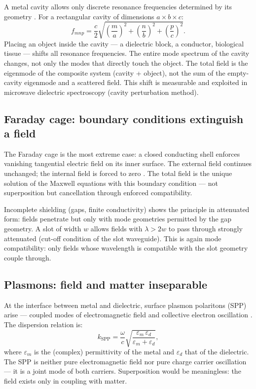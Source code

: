 A metal cavity allows only discrete resonance frequencies determined by
its geometry \cite{Pozar2012,Griffiths1999}. For a rectangular cavity
of dimensions $a \times b \times c$:
\[
  f_{mnp} = \frac{c}{2}\sqrt{\left(\frac{m}{a}\right)^2
    + \left(\frac{n}{b}\right)^2 + \left(\frac{p}{c}\right)^2}.
\]
Placing an object inside the cavity --- a dielectric block, a conductor,
biological tissue --- shifts all resonance frequencies. The entire mode
spectrum of the cavity changes, not only the modes that directly touch the
object. The total field is the eigenmode of the composite system (cavity
+ object), not the sum of the empty-cavity eigenmode and a scattered field.
This shift is measurable and exploited in microwave dielectric spectroscopy
(cavity perturbation method).

\subsection*{Faraday cage: boundary conditions extinguish a field}

The Faraday cage is the most extreme case: a closed conducting shell
enforces vanishing tangential electric field on its inner surface. The
external field continues unchanged; the internal field is forced to zero
\EM. The total field is the unique solution of the Maxwell equations with
this boundary condition --- not superposition but cancellation through
enforced compatibility.

Incomplete shielding (gaps, finite conductivity) shows the principle in
attenuated form: fields penetrate but only with mode geometries permitted
by the gap geometry. A slot of width $w$ allows fields with $\lambda > 2w$
to pass through strongly attenuated (cut-off condition of the slot
waveguide). This is again mode compatibility: only fields whose wavelength
is compatible with the slot geometry couple through.

\subsection*{Plasmons: field and matter inseparable}

At the interface between metal and dielectric, surface plasmon polaritons
(SPP) arise --- coupled modes of electromagnetic field and collective
electron oscillation \cite{Maier2007}. The dispersion relation is:
\[
  k_\mathrm{SPP} = \frac{\omega}{c}\sqrt{\frac{\varepsilon_m\,\varepsilon_d}
    {\varepsilon_m + \varepsilon_d}},
\]
where $\varepsilon_m$ is the (complex) permittivity of the metal and
$\varepsilon_d$ that of the dielectric. The SPP is neither pure
electromagnetic field nor pure charge carrier oscillation --- it is a
joint mode of both carriers. Superposition would be meaningless: the
field exists only in coupling with matter.

